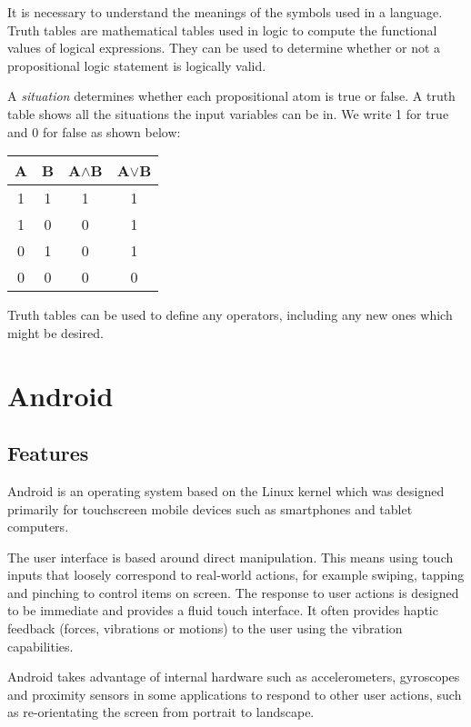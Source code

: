 \documentclass{report}
\begin{document}
It is necessary to understand the meanings of the symbols used in a language. Truth tables are mathematical tables used in logic to compute the functional values of logical expressions. They can be used to determine whether or not a propositional logic statement is logically valid.

A \textit{situation} determines whether each propositional atom is true or false. A truth table shows all the situations the input variables can be in. We write 1 for true and 0 for false as shown below:

\vspace{5 mm}
\begin{center}
  \begin{tabular}{ || c | c || c | c || }
    \hline
    A & B & A$\land$B & A$\lor$B \\ \hline
    1 & 1 & 1 & 1 \\
    1 & 0 & 0 & 1\\
    0 & 1 & 0 & 1 \\
    0 & 0 & 0 & 0 \\
    \hline
  \end{tabular}
\end{center}
\vspace{5 mm}

Truth tables can be used to define any operators, including any new ones which might be desired.

\section{Android}

\subsection{Features}

Android is an operating system based on the Linux kernel which was designed primarily for touchscreen mobile devices such as smartphones and tablet computers\cite{androidwiki}.

The user interface is based around direct manipulation. This means using touch inputs that loosely correspond to real-world actions, for example swiping, tapping and pinching to control items on screen. The response to user actions is designed to be immediate and provides a fluid touch interface. It often provides haptic feedback (forces, vibrations or motions) to the user using the vibration capabilities.

Android takes advantage of internal hardware such as accelerometers, gyroscopes and proximity sensors in some applications to respond to other user actions, such as re-orientating the screen from portrait to landscape.
\end{document}
